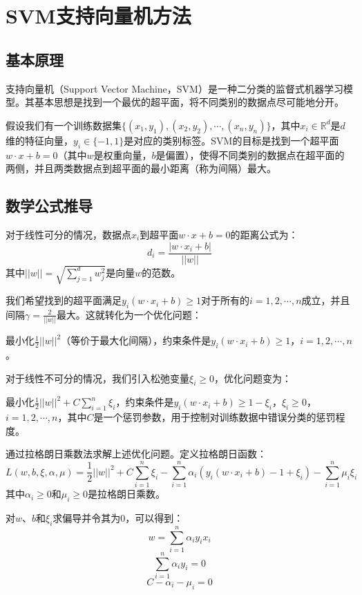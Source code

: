 \documentclass[12pt]{article}
\begin{document}
\section{SVM支持向量机方法}
    \subsection{基本原理}
支持向量机（Support Vector Machine，SVM）是一种二分类的监督式机器学习模型。其基本思想是找到一个最优的超平面，将不同类别的数据点尽可能地分开。

假设我们有一个训练数据集\(\{(x_1,y_1),(x_2,y_2),\cdots,(x_n,y_n)\}\)，其中\(x_i\in \mathbb{R}^d\)是\(d\)维的特征向量，\(y_i\in\{ - 1,1\}\)是对应的类别标签。SVM的目标是找到一个超平面\(w\cdot x + b = 0\)（其中\(w\)是权重向量，\(b\)是偏置），使得不同类别的数据点在超平面的两侧，并且两类数据点到超平面的最小距离（称为间隔）最大。

    \subsection{数学公式推导}
对于线性可分的情况，数据点\(x_i\)到超平面\(w\cdot x + b = 0\)的距离公式为：
\[
d_i=\frac{\vert w\cdot x_i + b\vert}{\vert\vert w\vert\vert}
\]
其中\(\vert\vert w\vert\vert=\sqrt{\sum_{j = 1}^{d}w_j^2}\)是向量\(w\)的范数。

我们希望找到的超平面满足\(y_i(w\cdot x_i + b)\geq1\)对于所有的\(i = 1,2,\cdots,n\)成立，并且间隔\(\gamma=\frac{2}{\vert\vert w\vert\vert}\)最大。这就转化为一个优化问题：

最小化\(\frac{1}{2}\vert\vert w\vert\vert^2\)（等价于最大化间隔），约束条件是\(y_i(w\cdot x_i + b)\geq1\)，\(i = 1,2,\cdots,n\)。

对于线性不可分的情况，我们引入松弛变量\(\xi_i\geq0\)，优化问题变为：

最小化\(\frac{1}{2}\vert\vert w\vert\vert^2 + C\sum_{i = 1}^{n}\xi_i\)，约束条件是\(y_i(w\cdot x_i + b)\geq1-\xi_i\)，\(\xi_i\geq0\)，\(i = 1,2,\cdots,n\)，其中\(C\)是一个惩罚参数，用于控制对训练数据中错误分类的惩罚程度。

通过拉格朗日乘数法求解上述优化问题。定义拉格朗日函数：
\[
L(w,b,\xi,\alpha,\mu)=\frac{1}{2}\vert\vert w\vert\vert^2 + C\sum_{i = 1}^{n}\xi_i-\sum_{i = 1}^{n}\alpha_i(y_i(w\cdot x_i + b)-1+\xi_i)-\sum_{i = 1}^{n}\mu_i\xi_i
\]
其中\(\alpha_i\geq0\)和\(\mu_i\geq0\)是拉格朗日乘数。

对\(w\)、\(b\)和\(\xi_i\)求偏导并令其为0，可以得到：
\[
w=\sum_{i = 1}^{n}\alpha_iy_ix_i
\]
\[
\sum_{i = 1}^{n}\alpha_iy_i = 0
\]
\[
C-\alpha_i-\mu_i = 0
\]
\end{document}
